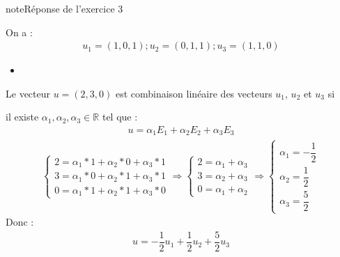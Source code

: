 \documentclass[letterpaper,10pt,french]{jupyterBook}
\begin{document}
\begin{sphinxadmonition}{note}{Réponse de l’exercice 3}

\sphinxAtStartPar
On a :
\begin{equation*}
\begin{split}
u_1=(1,0,1) ; u_2=(0,1,1) ; u_3=(1,1,0)
\end{split}
\end{equation*}\begin{itemize}
\item {} 
\sphinxAtStartPar
{}

\end{itemize}

\sphinxAtStartPar
Le vecteur \(u=(2,3,0)\) est combinaison linéaire des vecteurs \(u_1\), \(u_2\) et \(u_3\) si

\sphinxAtStartPar
il existe \(\alpha_1, \alpha_2, \alpha_3 \in \mathbb{R}\) tel que :
\begin{equation*}
\begin{split}
u = \alpha_1E_1 + \alpha_2E_2 + \alpha_3E_3
\end{split}
\end{equation*}\begin{equation*}
\begin{split}
    \begin{cases}
      2 =\alpha_1 *1 + \alpha_2* 0 + \alpha_3*1\\
      3 =\alpha_1* 0 + \alpha_2*1 + \alpha_3* 1 \\
      0 = \alpha_1* 1 + \alpha_2* 1 + \alpha_3* 0 
    \end{cases} 
    \Rightarrow
        \begin{cases}
      2 =\alpha_1 + \alpha_3\\
      3 =\alpha_2 + \alpha_3 \\
      0 = \alpha_1 + \alpha_2
    \end{cases} 
        \Rightarrow
        \begin{cases}
      \alpha_1 = -\dfrac{1}{2} \\
      \alpha_2 = \dfrac{1}{2} \\
      \alpha_3 = \dfrac{5}{2} 
      \end{cases}
\end{split}
\end{equation*}
\sphinxAtStartPar
Donc :
\begin{equation*}
\begin{split}
u = -\dfrac{1}{2}u_1 + \dfrac{1}{2}u_2 + \dfrac{5}{2}u_3
\end{split}
\end{equation*}\end{sphinxadmonition}
\end{document}
